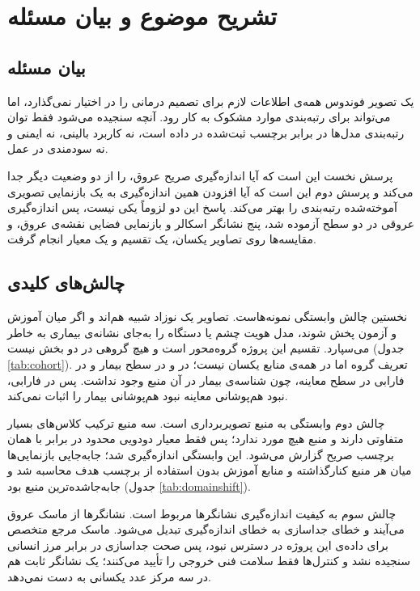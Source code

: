 \clearpage
\section{تشریح موضوع و بیان مسئله}
\subsection{بیان مسئله}

یک تصویر فوندوس همه‌ی اطلاعات لازم برای تصمیم درمانی را در اختیار نمی‌گذارد، اما می‌تواند برای رتبه‌بندی موارد مشکوک به کار رود. آنچه سنجیده می‌شود فقط توان رتبه‌بندی مدل‌ها در برابر برچسب ثبت‌شده در داده است، نه کاربرد بالینی، نه ایمنی و نه سودمندی در عمل.

پرسش نخست این است که آیا اندازه‌گیری صریح عروق،  را از دو وضعیت دیگر جدا می‌کند و پرسش دوم این است که آیا افزودن همین اندازه‌گیری به یک بازنمایی تصویری آموخته‌شده رتبه‌بندی را بهتر می‌کند. پاسخ این دو لزوماً یکی نیست، پس اندازه‌گیری عروقی در دو سطح آزموده شد، پنج نشانگر اسکالر و بازنمایی فضایی نقشه‌ی عروق، و مقایسه‌ها روی تصاویر یکسان، یک تقسیم و یک معیار انجام گرفت.

\subsection{چالش‌های کلیدی}

نخستین چالش وابستگی نمونه‌هاست. تصاویر یک نوزاد شبیه هم‌اند و اگر میان آموزش و آزمون پخش شوند، مدل هویت چشم یا دستگاه را به‌جای نشانه‌ی بیماری به خاطر می‌سپارد. تقسیم این پروژه گروه‌محور است و هیچ گروهی در دو بخش نیست (جدول \autoref{tab:cohort}). تعریف گروه اما در همه‌ی منابع یکسان نیست؛ در  و  در سطح بیمار و در فارابی در سطح معاینه، چون شناسه‌ی بیمار در آن منبع وجود نداشت. پس در فارابی، نبود هم‌پوشانی معاینه نبود هم‌پوشانی بیمار را اثبات نمی‌کند.

چالش دوم وابستگی به منبع تصویربرداری است. سه منبع ترکیب کلاس‌های بسیار متفاوتی دارند و منبع  هیچ مورد  ندارد؛ پس فقط معیار دودویی محدود  در برابر  با همان برچسب صریح گزارش می‌شود. این وابستگی اندازه‌گیری شد؛ جابه‌جایی بازنمایی‌ها میان هر منبع کنارگذاشته و منابع آموزش بدون استفاده از برچسب هدف محاسبه شد و  جابه‌جاشده‌ترین منبع بود (جدول \autoref{tab:domainshift}).

چالش سوم به کیفیت اندازه‌گیری نشانگرها مربوط است. نشانگرها از ماسک عروق می‌آیند و خطای جداسازی به خطای اندازه‌گیری تبدیل می‌شود. ماسک مرجع متخصص برای داده‌ی این پروژه در دسترس نبود، پس صحت جداسازی در برابر مرز انسانی سنجیده نشد و کنترل‌ها فقط سلامت فنی خروجی را تأیید می‌کنند؛ یک نشانگر ثابت هم در سه مرکز عدد یکسانی به دست نمی‌دهد.

